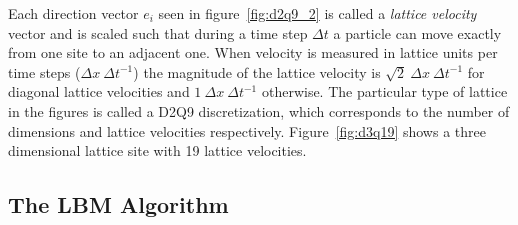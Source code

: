 Each direction vector $e_i$ seen in figure~\ref{fig:d2q9_2} is called a \textit{lattice velocity} vector and is scaled such that during a time step $\Delta t$ a particle can move exactly from one site to an adjacent one. When velocity is measured in lattice units per time steps ($\Delta x~\Delta{t}^{-1}$) the magnitude of the lattice velocity is $\sqrt{2}~\Delta x~\Delta{t}^{-1}$ for diagonal lattice velocities and $1~\Delta x~\Delta{t}^{-1}$ otherwise. The particular type of lattice in the figures is called a D2Q9 discretization, which corresponds to the number of dimensions and lattice velocities respectively. Figure~\ref{fig:d3q19} shows a three dimensional lattice site with 19 lattice velocities.

\subsection{The LBM Algorithm}
